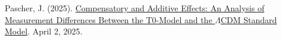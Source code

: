 \documentclass[a4paper,12pt]{article}
\newcommand{\repobase}{https://github.com/jpascher/T0-Time-Mass-Duality/tree/main/2/}
\begin{document}
	
	\begin{thebibliography}{99}
		 Pascher, J. (2025). \href{\repobase/pdf/Deutsch/Analyse der Messdifferenzen zwischen dem T0-Modell und dem Standardmodell.pdf}{Compensatory and Additive Effects: An Analysis of Measurement Differences Between the T0-Model and the $\Lambda$CDM Standard Model}. April 2, 2025.
	\end{thebibliography}
	
\end{document}
